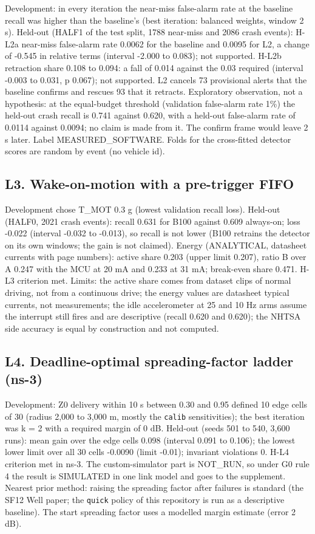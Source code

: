 Development: in every iteration the near-miss false-alarm rate at the baseline recall was higher than the baseline's (best iteration: balanced weights, window 2 s). Held-out (HALF1 of the test split, 1788 near-miss and 2086 crash events): H-L2a near-miss false-alarm rate 0.0062 for the baseline and 0.0095 for L2, a change of -0.545 in relative terms (interval -2.000 to 0.083); not supported. H-L2b retraction share 0.108 to 0.094: a fall of 0.014 against the 0.03 required (interval -0.003 to 0.031, p 0.067); not supported. L2 cancels 73 provisional alerts that the baseline confirms and rescues 93 that it retracts. Exploratory observation, not a hypothesis: at the equal-budget threshold (validation false-alarm rate 1\%) the held-out crash recall is 0.741 against 0.620, with a held-out false-alarm rate of 0.0114 against 0.0094; no claim is made from it. The confirm frame would leave 2 s later. Label MEASURED\_SOFTWARE. Folds for the cross-fitted detector scores are random by event (no vehicle id).

\subsection*{L3. Wake-on-motion with a pre-trigger FIFO}

Development chose T\_MOT 0.3 g (lowest validation recall loss). Held-out (HALF0, 2021 crash events): recall 0.631 for B100 against 0.609 always-on; loss -0.022 (interval -0.032 to -0.013), so recall is not lower (B100 retrains the detector on its own windows; the gain is not claimed). Energy (ANALYTICAL, datasheet currents with page numbers): active share 0.203 (upper limit 0.207), ratio B over A 0.247 with the MCU at 20 mA and 0.233 at 31 mA; break-even share 0.471. H-L3 criterion met. Limits: the active share comes from dataset clips of normal driving, not from a continuous drive; the energy values are datasheet typical currents, not measurements; the idle accelerometer at 25 and 10 Hz arms assume the interrupt still fires and are descriptive (recall 0.620 and 0.620); the NHTSA side accuracy is equal by construction and not computed.

\subsection*{L4. Deadline-optimal spreading-factor ladder (ns-3)}

Development: Z0 delivery within 10 s between 0.30 and 0.95 defined 10 edge cells of 30 (radius 2,000 to 3,000 m, mostly the \texttt{calib} sensitivities); the best iteration was k = 2 with a required margin of 0 dB. Held-out (seeds 501 to 540, 3,600 runs): mean gain over the edge cells 0.098 (interval 0.091 to 0.106); the lowest lower limit over all 30 cells -0.0090 (limit -0.01); invariant violations 0. H-L4 criterion met in ns-3. The custom-simulator part is NOT\_RUN, so under G0 rule 4 the result is SIMULATED in one link model and goes to the supplement. Nearest prior method: raising the spreading factor after failures is standard (the SF12 Well paper; the \texttt{quick} policy of this repository is run as a descriptive baseline). The start spreading factor uses a modelled margin estimate (error 2 dB).

